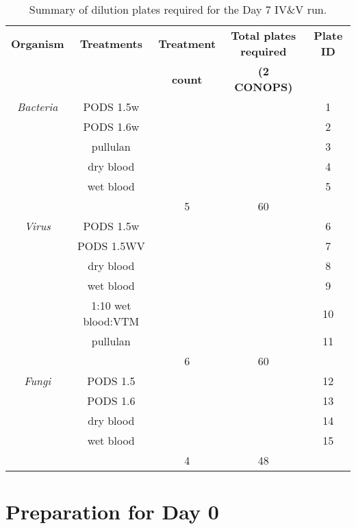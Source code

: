 \documentclass{article}
\begin{document}
\begin{table}
  \centering
  \begin{tabular}[]{c|c|c|c|c}
    \textbf{Organism} & \textbf{Treatments}  & \textbf{Treatment} & \textbf{Total plates required} & \textbf{Plate ID}\\
     &   & \textbf{count} & \textbf{(2 CONOPS)} & \\
    \hline
    \textit{Bacteria} & PODS 1.5w   & & & 1\\
     & PODS 1.6w   & & & 2\\
     & pullulan & & & 3\\
     & dry blood   & & & 4\\
     & wet blood   & & & 5\\
    \hline
    &  & 5& 60& \\
    \hline
    \textit{Virus} & PODS 1.5w & & & 6\\
     & PODS 1.5WV & & & 7\\
     & dry blood   & & & 8\\
     & wet blood   & & & 9\\
             & 1:10 wet blood:VTM   & & & 10\\
 & pullulan & & & 11\\
    \hline
    &  & 6& 60 & \\
    \hline
    \textit{Fungi} & PODS 1.5 & & & 12\\
     & PODS 1.6 & & & 13\\
     & dry blood   & & & 14\\
     & wet blood   & & & 15\\
    \hline
    &  & 4 & 48 & \\
    \hline

  \end{tabular}
  \caption{Summary of dilution plates required for the Day 7 IV\&V run.}
  \label{tab:dilution-plan-day-7}
\end{table}

\newpage
\section{Preparation for Day 0}\label{sec:day0-prep}
\end{document}

